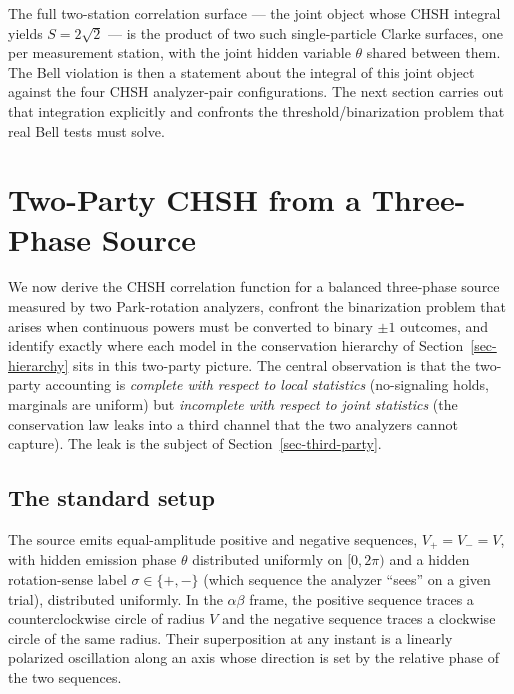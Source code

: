 \documentclass[
  11pt]{article}
\begin{document}
The full two-station correlation surface --- the joint object whose CHSH
integral yields \(S = 2\sqrt{2}\) --- is the product of two such
single-particle Clarke surfaces, one per measurement station, with the
joint hidden variable \(\theta\) shared between them. The Bell violation
is then a statement about the integral of this joint object against the
four CHSH analyzer-pair configurations. The next section carries out
that integration explicitly and confronts the threshold/binarization
problem that real Bell tests must solve.

\newpage

\section{Two-Party CHSH from a Three-Phase Source}\label{sec-two-party}

We now derive the CHSH correlation function for a balanced three-phase
source measured by two Park-rotation analyzers, confront the
binarization problem that arises when continuous powers must be
converted to binary \(\pm 1\) outcomes, and identify exactly where each
model in the conservation hierarchy of Section~\ref{sec-hierarchy} sits
in this two-party picture. The central observation is that the two-party
accounting is \emph{complete with respect to local statistics}
(no-signaling holds, marginals are uniform) but \emph{incomplete with
respect to joint statistics} (the conservation law leaks into a third
channel that the two analyzers cannot capture). The leak is the subject
of Section~\ref{sec-third-party}.

\subsection{The standard setup}\label{the-standard-setup}

The source emits equal-amplitude positive and negative sequences,
\(V_+ = V_- = V\), with hidden emission phase \(\theta\) distributed
uniformly on \([0, 2\pi)\) and a hidden rotation-sense label
\(\sigma \in \{+, -\}\) (which sequence the analyzer ``sees'' on a given
trial), distributed uniformly. In the \(\alpha\beta\) frame, the
positive sequence traces a counterclockwise circle of radius \(V\) and
the negative sequence traces a clockwise circle of the same radius.
Their superposition at any instant is a linearly polarized oscillation
along an axis whose direction is set by the relative phase of the two
sequences.
\end{document}
